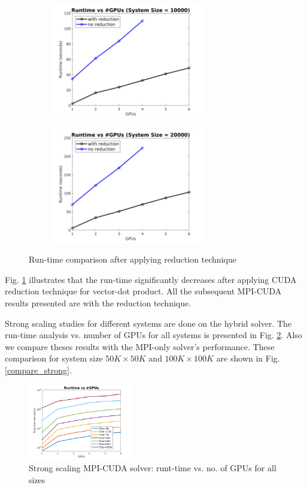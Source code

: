 \documentclass[sigplan,screen]{acmart}
\begin{document}
\begin{figure}
	\begin{subfigure}{0.35\textwidth}
		\includegraphics[trim= 10 5 35 10,clip, width=0.95\linewidth, height=5cm]{CUDA_strong_10k.png} 
		\caption{}
	\end{subfigure}
	\begin{subfigure}{0.35\textwidth}
		\includegraphics[trim= 10 5 35 10,clip, width=0.95\linewidth, height=5cm]{CUDA_strong_20k.png}
		\caption{}
	\end{subfigure}
	\caption{Run-time comparison after applying reduction technique}
	\label{compare}
\end{figure}
Fig. \ref{compare} illustrates that the run-time significantly decreases after applying CUDA reduction technique for vector-dot product. All the subsequent MPI-CUDA results presented are with the reduction technique. 

Strong scaling studies for different systems are done on the hybrid solver. The run-time analysis vs. number of GPUs for all systems is presented in Fig. \ref{cuda-strong}. Also we compare theses results with the MPI-only solver's performance. These comparison for system size $50K\times50K$ and $100K\times 100K$ are shown in Fig. \ref{compare_strong}.

\begin{figure}[h!]
	\begin{center}
		\includegraphics[width=0.4\textwidth]{CUDA_strong_allranks_log.png}
	\end{center}
	\caption{Strong scaling MPI-CUDA solver: runt-time vs. no. of GPUs for all sizes}
	\label{cuda-strong}      
\end{figure}
\end{document}
